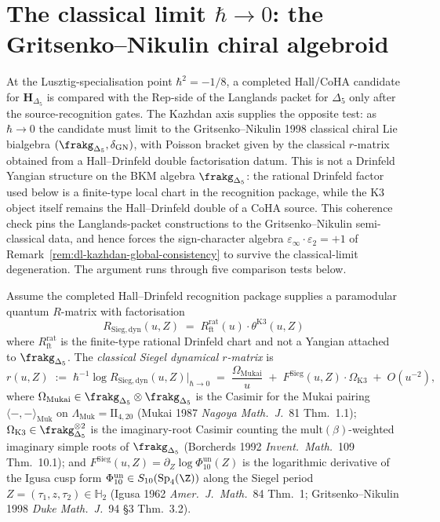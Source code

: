 \section{The classical limit $\hbar \to 0$: the Gritsenko--Nikulin chiral algebroid}
\label{sec:dl-kazhdan-classical}

At the Lusztig-specialisation point $\hbar^2 = -1/8$, a completed
Hall/CoHA candidate for $\mathbf H_{\Delta_5}$ is compared with the
Rep-side of the Langlands packet for $\Delta_5$ only after the
source-recognition gates. The Kazhdan axis supplies the opposite
test: as $\hbar\to 0$ the candidate must limit to the
Gritsenko--Nikulin 1998 classical chiral Lie bialgebra
$(\frakg_{\Delta_5}, \delta_{\mathrm{GN}})$, with Poisson bracket
given by the classical $r$-matrix obtained from a Hall--Drinfeld
double factorisation datum. This is not a Drinfeld Yangian structure
on the BKM algebra $\frakg_{\Delta_5}$: the rational Drinfeld factor
used below is a finite-type local chart in the recognition package,
while the K3 object itself remains the Hall--Drinfeld double of a
CoHA source. This coherence check pins the Langlands-packet
constructions to the Gritsenko--Nikulin semi-classical data, and
hence forces the sign-character algebra
$\varepsilon_\infty\cdot\varepsilon_2 = +1$ of
Remark~\ref{rem:dl-kazhdan-global-consistency} to survive the
classical-limit degeneration. The argument runs through five
comparison tests below.

\begin{definition}
\label{def:dl-classical-r}
Assume the completed Hall--Drinfeld recognition package supplies a
paramodular quantum $R$-matrix with factorisation
\[
 R_{\mathrm{Sieg,dyn}}(u, Z)
 \;=\;
 R^{\mathrm{rat}}_{\mathrm{ft}}(u)
 \cdot
 \theta^{\mathrm{K3}}(u, Z)
\]
where $R^{\mathrm{rat}}_{\mathrm{ft}}$ is the finite-type rational
Drinfeld chart and not a Yangian attached to
$\frakg_{\Delta_5}$. The \emph{classical Siegel dynamical
$r$-matrix} is
\begin{equation}
\label{eq:dl-classical-r}
 r(u, Z)
 \;:=\;
 \hbar^{-1}\log R_{\mathrm{Sieg,dyn}}(u, Z)\Big|_{\hbar\to 0}
 \;=\;
 \frac{\Omega_{\mathrm{Mukai}}}{u}
 \;+\;
 F^{\mathrm{Sieg}}(u, Z)\cdot\Omega_{\mathrm{K3}}
 \;+\;
 O(u^{-2}),
\end{equation}
where $\Omega_{\mathrm{Mukai}}\in\frakg_{\Delta_5}\otimes\frakg_{\Delta_5}$
is the Casimir for the Mukai pairing
$\langle-,-\rangle_{\mathrm{Muk}}$ on
$\Lambda_{\mathrm{Muk}} = \mathrm{II}_{4,20}$ (Mukai 1987
\emph{Nagoya Math.\ J.}~81 Thm.~1.1);
$\Omega_{\mathrm{K3}}\in\frakg_{\Delta_5}^{\otimes 2}$ is the
imaginary-root Casimir counting the $\mathrm{mult}(\beta)$-weighted
imaginary simple roots of $\frakg_{\Delta_5}$ (Borcherds 1992
\emph{Invent.\ Math.}~109 Thm.~10.1); and
$F^{\mathrm{Sieg}}(u, Z) = \partial_Z\log\Phi_{10}^{\mathrm{un}}(Z)$ is the
logarithmic derivative of the Igusa cusp form
$\Phi_{10}^{\mathrm{un}}\in S_{10}(\mathrm{Sp}_4(\Z))$ along the Siegel period
$Z = (\tau_1, z, \tau_2)\in\mathbb H_2$ (Igusa 1962
\emph{Amer.\ J.\ Math.}~84 Thm.~1; Gritsenko--Nikulin 1998
\emph{Duke Math.\ J.}~94 \S3 Thm.~3.2).
\end{definition}

